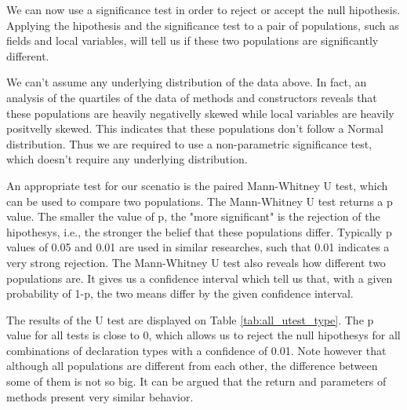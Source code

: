 \documentclass[preprint]{sigplanconf}
\begin{document}
We can now use a significance test in order to reject or accept the null hipothesis. 
Applying the hipothesis and the significance test to a pair of populations, such as fields and local variables, will tell us if these two populations are significantly different.

We can't assume any underlying distribution of the data above.
In fact, an analysis of the quartiles of the data of methods and constructors reveals that these populations are heavily negativelly skewed while local variables are heavily positvelly skewed.
This indicates that these populations don't follow a Normal distribution.
Thus we are required to use a non-parametric significance test, which doesn't require any underlying distribution.

An appropriate test for our scenatio is the paired Mann-Whitney U test, which can be used to compare two populations.
The Mann-Whitney U test returns a p value.
The smaller the value of p, the "more significant" is the rejection of the hipothesys, i.e., the stronger the belief that these populations differ.
Typically p values of 0.05 and 0.01 are used in similar researches, such that 0.01 indicates a very strong rejection.
The Mann-Whitney U test also reveals how different two populations are.
It gives us a confidence interval which tell us that, with a given probability of 1-p, the two means differ by the given confidence interval.

The results of the U test are displayed on Table \ref{tab:all_utest_type}.
The p value for all tests is close to 0, which allows us to reject the null hipothesys for all combinations of declaration types with a confidence of 0.01. Note however that although all populations are different from each other, the difference between some of them is not so big.
It can be argued that the return and parameters of methods present very similar behavior.
\end{document}
